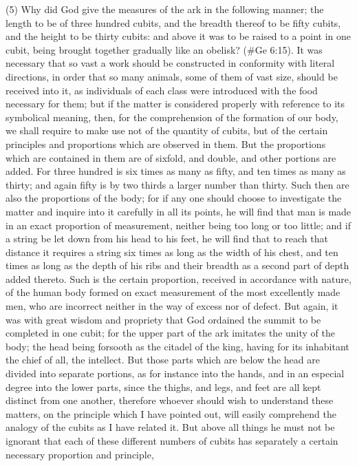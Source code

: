 (5) Why did God give the measures of the ark in the following manner; the length to be of three
hundred cubits, and the breadth thereof to be fifty cubits, and the height to be thirty cubits: and
above it was to be raised to a point in one cubit, being brought together gradually like an obelisk?
(\#Ge 6:15). It was necessary that so vast a work should be constructed in conformity with
literal directions, in order that so many animals, some of them of vast size, should be received into
it, as individuals of each class were introduced with the food necessary for them; but if the matter
is considered properly with reference to its symbolical meaning, then, for the comprehension of the
formation of our body, we shall require to make use not of the quantity of cubits, but of the certain
principles and proportions which are observed in them. But the proportions which are contained in
them are of sixfold, and double, and other portions are added. For three hundred is six times as
many as fifty, and ten times as many as thirty; and again fifty is by two thirds a larger number than
thirty. Such then are also the proportions of the body; for if any one should choose to investigate
the matter and inquire into it carefully in all its points, he will find that man is made in an exact
proportion of measurement, neither being too long or too little; and if a string be let down from his
head to his feet, he will find that to reach that distance it requires a string six times as long as the
width of his chest, and ten times as long as the depth of his ribs and their breadth as a second part
of depth added thereto. Such is the certain proportion, received in accordance with nature, of the
human body formed on exact measurement of the most excellently made men, who are incorrect
neither in the way of excess nor of defect. But again, it was with great wisdom and propriety that
God ordained the summit to be completed in one cubit; for the upper part of the ark imitates the
unity of the body; the head being forsooth as the citadel of the king, having for its inhabitant the
chief of all, the intellect. But those parts which are below the head are divided into separate
portions, as for instance into the hands, and in an especial degree into the lower parts, since the
thighs, and legs, and feet are all kept distinct from one another, therefore whoever should wish to
understand these matters, on the principle which I have pointed out, will easily comprehend the
analogy of the cubits as I have related it. But above all things he must not be ignorant that each of
these different numbers of cubits has separately a certain necessary proportion and principle,
